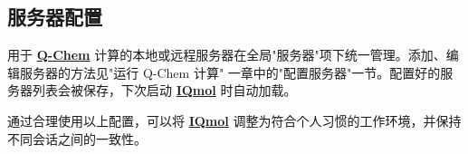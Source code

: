 \documentclass[a4paper,12pt]{ctexart}
\newcommand{\qchem}{\href{https://q-chem.com}{\textbf{Q-Chem}}}
\newcommand{\iqmol}{\href{https://www.iqmol.org}{\textbf{IQmol}}}
\begin{document}
\subsection*{服务器配置}

用于 \qchem{} 计算的本地或远程服务器在全局"服务器"项下统一管理。添加、编辑服务器的方法见"运行 Q-Chem 计算"
一章中的"配置服务器"一节。配置好的服务器列表会被保存，下次启动 \iqmol{} 时自动加载。

通过合理使用以上配置，可以将 \iqmol{} 调整为符合个人习惯的工作环境，并保持不同会话之间的一致性。




\end{document}
